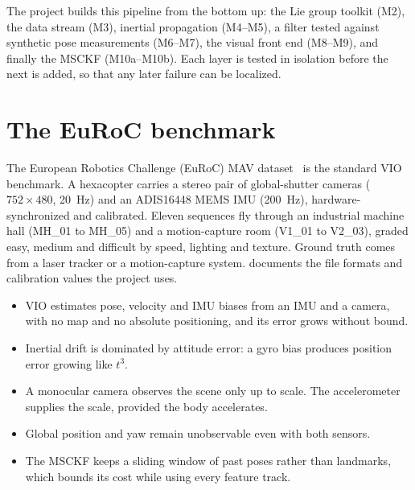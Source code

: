 \begin{projectlink}
The project builds this pipeline from the bottom up: the Lie group toolkit (M2), the data
stream (M3), inertial propagation (M4--M5), a filter tested against synthetic pose measurements
(M6--M7), the visual front end (M8--M9), and finally the MSCKF (M10a--M10b). Each layer is tested
in isolation before the next is added, so that any later failure can be localized.
\end{projectlink}

\section{The EuRoC benchmark}

The European Robotics Challenge (EuRoC) MAV dataset~\cite{burri2016euroc} is the standard VIO
benchmark. A hexacopter carries a stereo pair of global-shutter cameras ($752 \times 480$, 20~Hz)
and an ADIS16448 MEMS IMU (200~Hz), hardware-synchronized and calibrated. Eleven sequences fly
through an industrial machine hall (MH\_01 to MH\_05) and a motion-capture room (V1\_01 to V2\_03),
graded easy, medium and difficult by speed, lighting and texture. Ground truth comes from a laser
tracker or a motion-capture system.  documents the file formats and calibration
values the project uses.

\begin{takeaways}
\begin{itemize}
  \item VIO estimates pose, velocity and IMU biases from an IMU and a camera, with no map and no
        absolute positioning, and its error grows without bound.
  \item Inertial drift is dominated by attitude error: a gyro bias produces position error growing
        like $t^3$.
  \item A monocular camera observes the scene only up to scale. The accelerometer supplies the
        scale, provided the body accelerates.
  \item Global position and yaw remain unobservable even with both sensors.
  \item The MSCKF keeps a sliding window of past poses rather than landmarks, which bounds its cost
        while using every feature track.
\end{itemize}
\end{takeaways}

